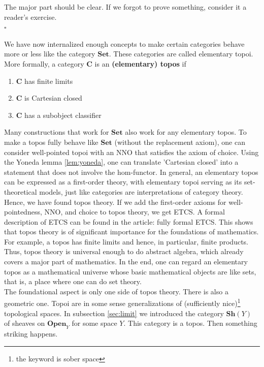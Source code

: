 \begin{prf}
The major part should be clear.
If we forgot to prove something, consider it a reader's exercise.
\\
\phantom{proven}
\hfill
$\square$
\end{prf}
We have now internalized enough concepts to make certain categories behave more or less like the category $\mathbf{Set}$.
These categories are called elementary topoi.
More formally, a category $\mathbf{C}$ is an \textbf{(elementary) topos} if
\begin{enumerate}
\item[(ET1)]
$\mathbf{C}$ has finite limits
\item[(ET2)]
$\mathbf{C}$ is Cartesian closed
\item[(ET3)]
$\mathbf{C}$ has a subobject classifier
\end{enumerate}
Many constructions that work for $\mathbf{Set}$ also work for any elementary topos.
To make a topos fully behave like $\mathbf{Set}$ (without the replacement axiom), one can consider well-pointed topoi with an NNO that satisfies the axiom of choice.
Using the Yoneda lemma \ref{lem:yoneda}, one can translate 'Cartesian closed' into a statement that does not involve the hom-functor.
In general, an elementary topos can be expressed as a first-order theory, with elementary topoi serving as its set-theoretical models, just like categories are interpretations of category theory.
Hence, we have found topos theory.
If we add the first-order axioms for well-pointedness, NNO, and choice to topos theory, we get ETCS.
A formal description of ETCS can be found in the \cite{wiki-nlab0000} article: fully formal ETCS.
This shows that topos theory is of significant importance for the foundations of mathematics.
For example, a topos has finite limits and hence, in particular, finite products.
Thus, topos theory is universal enough to do abstract algebra, which already covers a major part of mathematics.
In the end, one can regard an elementary topos as a mathematical universe whose basic mathematical objects are like sets, that is, a place where one can do set theory.
\\
The foundational aspect is only one side of topos theory.
There is also a geometric one.
Topoi are in some sense generalizations of (sufficiently nice)\footnote{the keyword is sober space} topological spaces.
In subsection \ref{sec:limit} we introduced the category $\mathbf{Sh}(Y)$ of sheaves on $\mathbf{Open}_{Y}$ for some space $Y$.
This category is a topos.
Then something striking happens.
